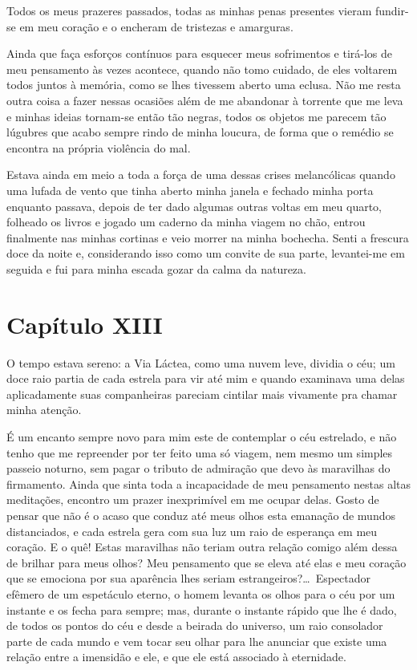  Todos os meus prazeres passados, todas as minhas penas presentes vieram
fundir-se em meu coração e o encheram de tristezas e amarguras.

 Ainda que faça esforços contínuos para esquecer meus sofrimentos e
tirá-los de meu pensamento às vezes acontece, quando não tomo cuidado,
de eles voltarem todos juntos à memória, como se lhes tivessem aberto
uma eclusa. Não me resta outra coisa a fazer nessas ocasiões além de me
abandonar à torrente que me leva e minhas ideias tornam-se então tão
negras, todos os objetos me parecem tão lúgubres que acabo sempre rindo
de minha loucura, de forma que o remédio se encontra na própria
violência do mal.

 Estava ainda em meio a toda a força de uma dessas crises melancólicas
quando uma lufada de vento que tinha aberto minha janela e fechado
minha porta enquanto passava, depois de ter dado algumas outras voltas
em meu quarto, folheado os livros e jogado um caderno da minha viagem
no chão, entrou finalmente nas minhas cortinas e veio morrer na minha
bochecha. Senti a frescura doce da noite e, considerando isso como um
convite de sua parte, levantei-me em seguida e fui para minha escada
gozar da calma da natureza. 

 \section*{Capítulo XIII}

 O tempo estava sereno: a Via Láctea, como uma nuvem leve, dividia o
céu; um doce raio partia de cada estrela para vir até mim e quando
examinava uma delas aplicadamente suas companheiras pareciam cintilar
mais vivamente pra chamar minha atenção.

 É um encanto sempre novo para mim este de contemplar o céu estrelado, e
não tenho que me repreender por ter feito uma só viagem, nem mesmo um
simples passeio noturno, sem pagar o tributo de admiração que devo às
maravilhas do firmamento. Ainda que sinta toda a incapacidade de meu
pensamento nestas altas meditações, encontro um prazer inexprimível em
me ocupar delas. Gosto de pensar que não é o acaso que conduz até meus
olhos esta emanação de mundos distanciados, e cada estrela gera com sua
luz um raio de esperança em meu coração. E o quê! Estas maravilhas não
teriam outra relação comigo além dessa de brilhar para meus olhos? Meu
pensamento que se eleva até elas e meu coração que se emociona por sua
aparência lhes seriam estrangeiros?\ldots\ Espectador efêmero de um
espetáculo eterno, o homem levanta os olhos para o céu por um instante
e os fecha para sempre; mas, durante o instante rápido que lhe é dado,
de todos os pontos do céu e desde a beirada do universo, um raio
consolador parte de cada mundo e vem tocar seu olhar para lhe anunciar
que existe uma relação entre a imensidão e ele, e que ele está
associado à eternidade.

